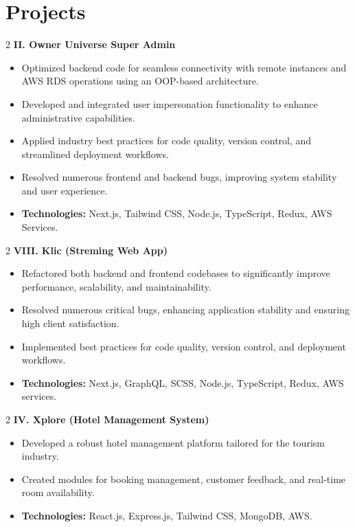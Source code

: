 \documentclass[10pt, letterpaper]{article}
\newenvironment{highlights}{
    \begin{itemize}[
        topsep=0.10 cm,
        parsep=0.10 cm,
        partopsep=0pt,
        itemsep=0pt,
        leftmargin=0.4 cm + 10pt
    ]
}{
    \end{itemize}
}
\newenvironment{twocolentry}[2][]{
    \onecolentry
    \def\secondColumn{#2}
    \setcolumnwidth{\fill, 4.5 cm}
    \begin{paracol}{2}
}{
    \switchcolumn \raggedleft \secondColumn
    \end{paracol}
    \endonecolentry
}
\let\hrefWithoutArrow\href
\renewcommand{\href}[2]{\hrefWithoutArrow{#1}{\ifthenelse{\equal{#2}{}}{ }{#2 }\raisebox{.15ex}{\footnotesize \faExternalLink*}}}
\begin{document}
\section{Projects}
\vspace{1em}
\begin{twocolentry}{
		\href{https://osfrontend.ownersjungle.com/owner-inventory/dashboard}{Live}
	}{
		\textbf{II. Owner Universe Super Admin}
	}
\begin{highlights}
    \item Optimized backend code for seamless connectivity with remote instances and AWS RDS operations using an OOP-based architecture.
    \item Developed and integrated user impersonation functionality to enhance administrative capabilities.
    \item Applied industry best practices for code quality, version control, and streamlined deployment workflows.
    \item Resolved numerous frontend and backend bugs, improving system stability and user experience.
    \item \textbf{Technologies:} Next.js, Tailwind CSS, Node.js, TypeScript, Redux, AWS Services.
\end{highlights}
\end{twocolentry}
\vspace{1em}
\begin{twocolentry}{
		\href{https://dev.klic.gg}{Live}
	}{
		\textbf{VIII. Klic (Streming Web App)}
	}
	\begin{highlights}
    \item Refactored both backend and frontend codebases to significantly improve performance, scalability, and maintainability.
    \item Resolved numerous critical bugs, enhancing application stability and ensuring high client satisfaction.
    \item Implemented best practices for code quality, version control, and deployment workflows.
    \item \textbf{Technologies:} Next.js, GraphQL, SCSS, Node.js, TypeScript, Redux, AWS services.
\end{highlights}
\end{twocolentry}
\vspace{1em}
\begin{twocolentry}{
		\href{https://xplorepk.com/}{Live}
	}{
		\textbf{IV. Xplore (Hotel Management System)}
	}
	\begin{highlights}
		\item Developed a robust hotel management platform tailored for the tourism industry.
		\item Created modules for booking management, customer feedback, and real-time room availability.
		\item \textbf{Technologies:} React.js, Express.js, Tailwind CSS, MongoDB, AWS.
	\end{highlights}
\end{twocolentry}
\end{document}
